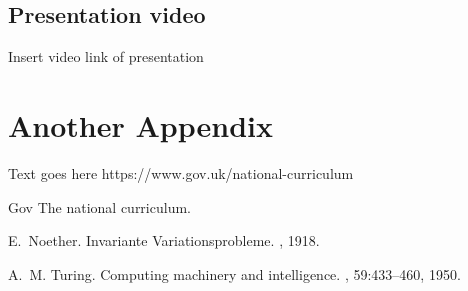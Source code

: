 \documentclass[12pt, a4paper,oneside]{book}
\numberwithin{equation}{section}
\begin{document}
\section{Presentation video}\label{secx.x}

Insert video link of presentation



\chapter{Another Appendix}

Text goes here
https://www.gov.uk/national-curriculum



\begin{thebibliography}{999}


\bibitem{}
Gov
\newblock The national curriculum.

E.~Noether.
\newblock Invariante {V}ariationsprobleme.
, 1918.

A.~M. Turing.
\newblock Computing machinery and intelligence.
, 59:433--460, 1950.


\end{thebibliography}
\end{document}
